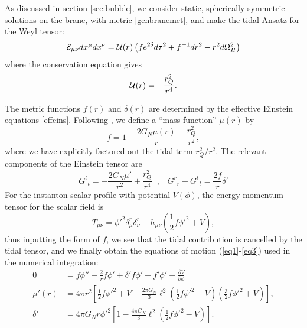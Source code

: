 \documentclass[aps,12pt,prd,superscriptaddress,preprintnumbers, 
	amssymb,
	amsmath,
	notitlepage,
	longbibliography,
	nofootinbib]{revtex4-1}
\newcommand{\be}{\begin{equation}}
\newcommand{\ee}{\end{equation}}
\newcommand{\beal}{\begin{aligned}}
\newcommand{\eeal}{\end{aligned}}
\begin{document}
As discussed in section \ref{sec:bubble}, we consider 
static, spherically symmetric solutions on the brane, with
metric \eqref{genbranemet}, and make the tidal Ansatz for
the Weyl tensor:
\begin{equation}
{\cal E}_{\mu\nu} dx^\mu dx^\nu = {\cal U}(r) 
\left( f e^{2\delta} d\tau^2 + f^{-1} dr^2 - r^2 d\Omega^2_{I\!I} \right)
\end{equation}
where the conservation equation gives
\begin{equation}
{\cal U}(r) = - \frac{r_Q^2}{r^4}.\label{rhoE}
\end{equation} 

The metric functions $f(r)$ and $\delta(r)$ are determined by the 
effective Einstein equations \eqref{effeins}. Following \cite{BGM3},
we define a ``mass function'' $\mu(r)$ by
\begin{equation}
f=1 - \frac{2 G_N \mu(r)}{r} - \frac{r_Q^2}{r^2},
\label{appdeff}
\end{equation}
where we have explicitly factored out the tidal term $r_Q^2/r^2$.
The relevant components of the Einstein tensor are
\be
G^t{}_t = - \frac{2G_N \mu'}{r^2} +\frac{r_Q^2}{r^4}\;\;,\;\;\;
G^r{}_r-G^t{}_t = \frac{2f}{ r}\delta'
\ee
For the instanton scalar profile with potential $V(\phi)$, 
the energy-momentum tensor for the scalar field is
\begin{equation}
T_{\mu\nu} = \phi'^2 \delta_\mu^r \delta^r_\nu 
- h_{\mu\nu} \left(\frac12 f \phi'^2 + V \right),
\end{equation}
thus inputting the form of $f$, we see that the tidal contribution is 
cancelled by the tidal tensor, and we finally obtain the equations of motion
(\ref{eq1}-\ref{eq3}) used in the numerical integration:
\be
\beal
0&= f \phi''  + \frac{2}{r} f \phi' +
\delta' f \phi' + f' \phi' - \frac{\partial{V} }{ {\partial \phi}} \\
\mu'(r) &= 4\pi r^2 \left[ \frac12 f \phi'^2 +V 
- \frac{2 \pi G_N}{3} \ell^2 ( \frac12 f \phi'^2 - V )
(\frac32 f \phi'^2 + V)  \right] ,\\
\delta ' &= 4 \pi G_N r \phi'^2 \left[ 1- \frac{4 \pi G_N}{3} \ell^2 ( \frac12 f \phi'^2 - V )
\right].
\eeal
\ee
\end{document}
